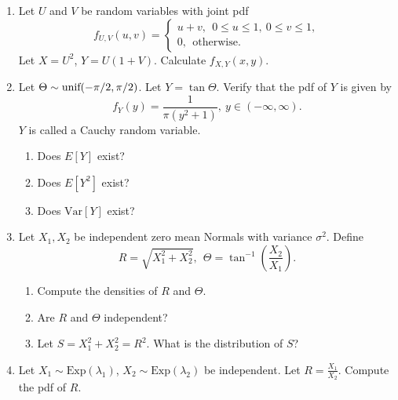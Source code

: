 \documentclass[11pt]{article}
\begin{document}
\begin{enumerate}
\item Let $U$ and $V$ be random variables with joint pdf
\[
f_{U,V}(u,v) = \begin{cases}
u+v, ~~0 \le u \le 1,~0\le v \le 1,\\
0, ~~\text{otherwise.}
\end{cases}
\]
Let $X = U^2$, $Y=U(1+V)$. Calculate $f_{X,Y}(x,y)$.

\item Let $\Theta \sim \text{\text{unif}}(-\pi/2, \pi/2)$. Let $Y = \tan \Theta$. Verify that the pdf of $Y$ is given by
\[
f_Y(y) = \frac{1}{\pi(y^2+1)}, ~y \in (-\infty,\infty).
\]
$Y$ is called a Cauchy random variable.
\begin{enumerate}
\item Does ${E}[Y]$ exist?
\item Does ${E}[Y^2]$ exist?
\item Does $\text{Var}[Y]$ exist?
\end{enumerate}

\item Let $X_1, X_2 $ be independent zero mean Normals with variance $\sigma^2$. Define
\[
R = \sqrt{X_1^2+X_2^2}, ~~\Theta = \tan^{-1}\left(\frac{X_2}{X_1}\right).
\]
\begin{enumerate}
\item Compute the densities of $R$ and $\Theta$. 
\item Are $R$ and $\Theta$ independent?
\item Let $S = X_1^2 + X_2^2 = R^2$. What is the distribution of $S$?
\end{enumerate}

\item Let $X_1 \sim \text{Exp}(\lambda_1)$, $X_2 \sim \text{Exp}(\lambda_2)$ be independent. Let $R = \frac{X_1}{X_2}$. Compute the pdf of $R$.

\end{enumerate}
\end{document}
